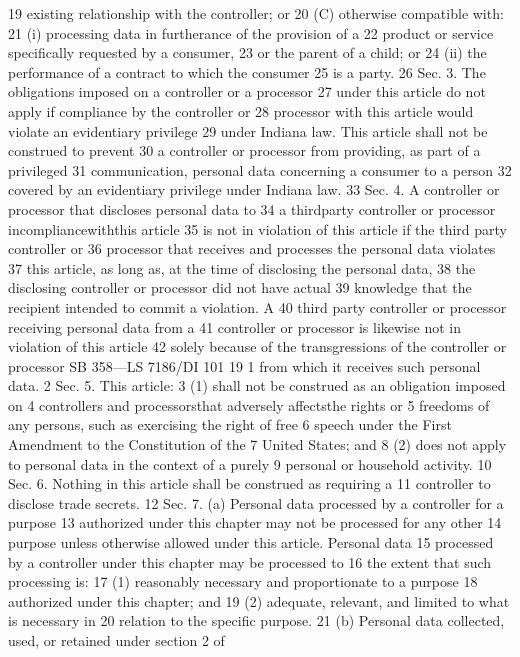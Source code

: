 19 existing relationship with the controller; or
20 (C) otherwise compatible with:
21 (i) processing data in furtherance of the provision of a
22 product or service specifically requested by a consumer,
23 or the parent of a child; or
24 (ii) the performance of a contract to which the consumer
25 is a party.
26 Sec. 3. The obligations imposed on a controller or a processor
27 under this article do not apply if compliance by the controller or
28 processor with this article would violate an evidentiary privilege
29 under Indiana law. This article shall not be construed to prevent
30 a controller or processor from providing, as part of a privileged
31 communication, personal data concerning a consumer to a person
32 covered by an evidentiary privilege under Indiana law.
33 Sec. 4. A controller or processor that discloses personal data to
34 a thirdparty controller or processor incompliancewiththis article
35 is not in violation of this article if the third party controller or
36 processor that receives and processes the personal data violates
37 this article, as long as, at the time of disclosing the personal data,
38 the disclosing controller or processor did not have actual
39 knowledge that the recipient intended to commit a violation. A
40 third party controller or processor receiving personal data from a
41 controller or processor is likewise not in violation of this article
42 solely because of the transgressions of the controller or processor
SB 358—LS 7186/DI 101
19
1 from which it receives such personal data.
2 Sec. 5. This article:
3 (1) shall not be construed as an obligation imposed on
4 controllers and processorsthat adversely affectsthe rights or
5 freedoms of any persons, such as exercising the right of free
6 speech under the First Amendment to the Constitution of the
7 United States; and
8 (2) does not apply to personal data in the context of a purely
9 personal or household activity.
10 Sec. 6. Nothing in this article shall be construed as requiring a
11 controller to disclose trade secrets.
12 Sec. 7. (a) Personal data processed by a controller for a purpose
13 authorized under this chapter may not be processed for any other
14 purpose unless otherwise allowed under this article. Personal data
15 processed by a controller under this chapter may be processed to
16 the extent that such processing is:
17 (1) reasonably necessary and proportionate to a purpose
18 authorized under this chapter; and
19 (2) adequate, relevant, and limited to what is necessary in
20 relation to the specific purpose.
21 (b) Personal data collected, used, or retained under section 2 of

